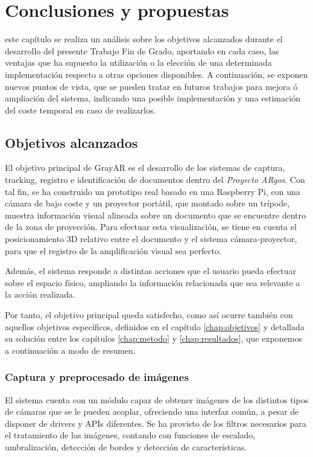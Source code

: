 \chapter{Conclusiones y propuestas}
\label{chap:conclusiones}
 este capítulo se realiza un análisis sobre los objetivos alcanzados durante el desarrollo del presente Trabajo Fin de Grado, aportando en cada caso, las ventajas que ha supuesto la utilización o la elección de una determinada implementación respecto a otras opciones disponibles. A continuación, se exponen nuevos puntos de vista, que se pueden tratar en futuros trabajos para mejora ó ampliación del sistema, indicando una posible implementación y una estimación del coste temporal en caso de realizarlos. 

\section{Objetivos alcanzados}

El objetivo principal de GrayAR es el desarrollo de los sistemas de captura, tracking, registro e identificación de documentos dentro del \textit{Proyecto ARgos}. Con tal fin, se ha construido un prototipo real basado en una Raspberry Pi, con una cámara de bajo coste y un proyector portátil, que montado sobre un trípode, muestra información visual alineada sobre un documento que se encuentre dentro de la zona de proyección. Para efectuar esta visualización, se tiene en cuenta el posicionamiento 3D relativo entre el documento y el sistema cámara-proyector, para que el registro de la amplificación visual sea perfecto.

Además, el sistema responde a distintas acciones que el usuario pueda efectuar sobre el espacio físico, ampliando la información relacionada que sea relevante a la acción realizada.

Por tanto, el objetivo principal queda satisfecho, como así ocurre también con aquellos objetivos específicos, definidos en el capítulo \ref{chap:objetivos} y detallada su solución entre los capítulos \ref{chap:metodo} y  \ref{chap:resultados}, que exponemos a continuación a modo de resumen.   

\subsection{Captura y preprocesado de imágenes}
El sistema cuenta con un módulo capaz de obtener imágenes de los distintos tipos de cámaras que se le pueden acoplar, ofreciendo una interfaz común, a pesar de disponer de drivers y APIs diferentes. Se ha provisto de los filtros necesarios para el tratamiento de las imágenes, contando con funciones de escalado, umbralización, detección de bordes y detección de características.

